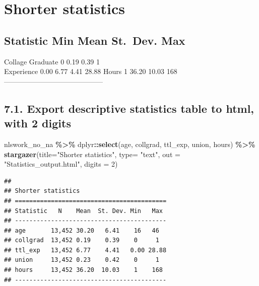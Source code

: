 \documentclass[
]{article}
\newenvironment{Shaded}{\begin{snugshade}}{\end{snugshade}}
\newcommand{\AttributeTok}[1]{\textcolor[rgb]{0.13,0.29,0.53}{#1}}
\newcommand{\DecValTok}[1]{\textcolor[rgb]{0.00,0.00,0.81}{#1}}
\newcommand{\FunctionTok}[1]{\textcolor[rgb]{0.13,0.29,0.53}{\textbf{#1}}}
\newcommand{\NormalTok}[1]{#1}
\newcommand{\SpecialCharTok}[1]{\textcolor[rgb]{0.81,0.36,0.00}{\textbf{#1}}}
\newcommand{\StringTok}[1]{\textcolor[rgb]{0.31,0.60,0.02}{#1}}
\begin{document}
\hypertarget{shorter-statistics}{%
\section{Shorter statistics}\label{shorter-statistics}}

\hypertarget{statistic-min-mean-st.-dev.-max}{%
\subsection{Statistic Min Mean St.~Dev.
Max}\label{statistic-min-mean-st.-dev.-max}}

Collage Graduate 0 0.19 0.39 1\\
Experience 0.00 6.77 4.41 28.88 Hours 1 36.20 10.03 168
------------------------------------------

\hypertarget{export-descriptive-statistics-table-to-html-with-2-digits}{%
\subsection{7.1. Export descriptive statistics table to html, with 2
digits}\label{export-descriptive-statistics-table-to-html-with-2-digits}}

\begin{Shaded}
\begin{Highlighting}[]
\NormalTok{nlswork\_no\_na }\SpecialCharTok{\%\textgreater{}\%}
\NormalTok{  dplyr}\SpecialCharTok{::}\FunctionTok{select}\NormalTok{(age, collgrad, ttl\_exp, union, hours) }\SpecialCharTok{\%\textgreater{}\%} 
  \FunctionTok{stargazer}\NormalTok{(}\AttributeTok{title=}\StringTok{"Shorter statistics"}\NormalTok{,}
            \AttributeTok{type=} \StringTok{"text"}\NormalTok{, }\AttributeTok{out =} \StringTok{"Statistics\_output.html"}\NormalTok{,}
            \AttributeTok{digits =} \DecValTok{2}\NormalTok{)}
\end{Highlighting}
\end{Shaded}

\begin{verbatim}
## 
## Shorter statistics
## ==========================================
## Statistic   N    Mean  St. Dev. Min   Max 
## ------------------------------------------
## age       13,452 30.20   6.41    16   46  
## collgrad  13,452 0.19    0.39    0     1  
## ttl_exp   13,452 6.77    4.41   0.00 28.88
## union     13,452 0.23    0.42    0     1  
## hours     13,452 36.20  10.03    1    168 
## ------------------------------------------
\end{verbatim}
\end{document}
